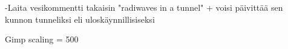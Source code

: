 -Laita vesikommentti takaisin "radiwaves in a tunnel" + voisi päivittää sen kunnon tunneliksi eli uloskäynnillisiseksi

Gimp scaling = 500 

